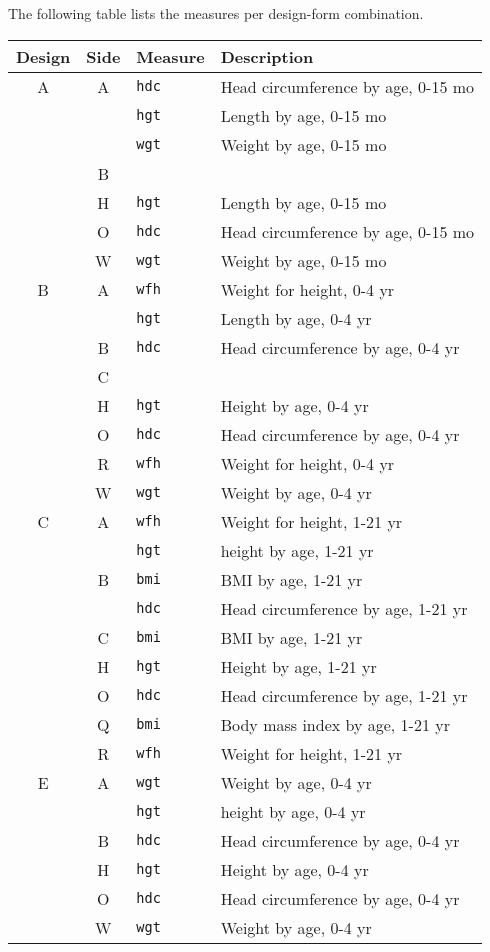 \documentclass[
]{book}
\begin{document}
The following table lists the measures per design-form combination.

\begin{longtable}[]{@{}ccll@{}}
\toprule
Design & Side & Measure & Description \\
\midrule
\endhead
A & A & \texttt{hdc} & Head circumference by age, 0-15 mo \\
& & \texttt{hgt} & Length by age, 0-15 mo \\
& & \texttt{wgt} & Weight by age, 0-15 mo \\
& B & & \\
& H & \texttt{hgt} & Length by age, 0-15 mo \\
& O & \texttt{hdc} & Head circumference by age, 0-15 mo \\
& W & \texttt{wgt} & Weight by age, 0-15 mo \\
B & A & \texttt{wfh} & Weight for height, 0-4 yr \\
& & \texttt{hgt} & Length by age, 0-4 yr \\
& B & \texttt{hdc} & Head circumference by age, 0-4 yr \\
& C & & \\
& H & \texttt{hgt} & Height by age, 0-4 yr \\
& O & \texttt{hdc} & Head circumference by age, 0-4 yr \\
& R & \texttt{wfh} & Weight for height, 0-4 yr \\
& W & \texttt{wgt} & Weight by age, 0-4 yr \\
C & A & \texttt{wfh} & Weight for height, 1-21 yr \\
& & \texttt{hgt} & height by age, 1-21 yr \\
& B & \texttt{bmi} & BMI by age, 1-21 yr \\
& & \texttt{hdc} & Head circumference by age, 1-21 yr \\
& C & \texttt{bmi} & BMI by age, 1-21 yr \\
& H & \texttt{hgt} & Height by age, 1-21 yr \\
& O & \texttt{hdc} & Head circumference by age, 1-21 yr \\
& Q & \texttt{bmi} & Body mass index by age, 1-21 yr \\
& R & \texttt{wfh} & Weight for height, 1-21 yr \\
E & A & \texttt{wgt} & Weight by age, 0-4 yr \\
& & \texttt{hgt} & height by age, 0-4 yr \\
& B & \texttt{hdc} & Head circumference by age, 0-4 yr \\
& H & \texttt{hgt} & Height by age, 0-4 yr \\
& O & \texttt{hdc} & Head circumference by age, 0-4 yr \\
& W & \texttt{wgt} & Weight by age, 0-4 yr \\
\bottomrule
\end{longtable}
\end{document}
